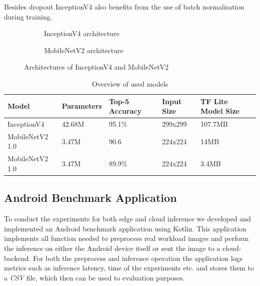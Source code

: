 Besides dropout InceptionV4 also benefits from the use of batch normalisation during training.

\begin{figure}[!htb]
\centering
\begin{subfigure}[t]{0.47\textwidth}
   \resizebox{.99\linewidth}{!}{}
   \caption{InceptionV4 architecture \cite{InceptionV4}}
   \label{fig:inceptionv4Archi} 
\end{subfigure}%
\begin{subfigure}[t]{0.47\textwidth}
   \resizebox{.99\linewidth}{!}{}
   \caption{MobileNetV2 architecture \cite{DBLP:journals/corr/abs-1801-04381}}
   \label{fig:MobileNetArchi}
\end{subfigure}

\caption{Architectures of InceptionV4 and MobileNetV2}
\end{figure}
\begin{table}[]
\caption{Overview of used models}
\label{table:modelOverview}
\begin{tabular}{@{}lllll@{}}
\toprule
Model & Parameters & Top-5 Accuracy\cite{modelspecs} & Input Size & TF Lite Model Size \\
\midrule
InceptionV4 & 42.68M & 95.1\% & 299x299 & 107.7MB \\
MobileNetV2 1.0 & 3.47M\cite{DBLP:journals/corr/abs-1801-04381} & 90.6 & 224x224 & 14MB \\
MobileNetV2 1.0 & 3.47M\cite{DBLP:journals/corr/abs-1801-04381} & 89.9\% & 224x224 & 3.4MB\\
\bottomrule
\end{tabular}
\end{table}


\subsection{Android Benchmark Application}
To conduct the experiments for both edge and cloud inference we developed and implemented an Android benchmark application using Kotlin.
This application implements all function needed to preprocess real workload images and perform the inference on either the Android device itself or sent the image to a cloud-backend.
For both the preprocess and inference operation the application logs metrics such as inference latency, time of the experiments etc. and stores them to a \emph{CSV} file, which then can be used to evaluation purposes.

